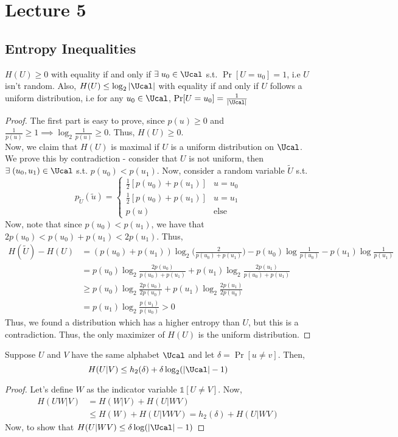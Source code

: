 \chapter{Lecture 5}
\section{Entropy Inequalities}
\begin{theorem}
$H(U) \geq 0$ with equality if and only if $\exists\; u_0 \in \Ucal$ s.t. $\Pr[U=u_0]=1$, i.e $U$ isn't random. Also, $H(U) \leq \log_2 |\Ucal|$ with equality if and only if $U$ follows a uniform distribution, i.e for any $u_0 \in \Ucal$, $\Pr[U=u_0] = \frac{1}{|\Ucal|}$
\end{theorem}
\begin{proof}
The first part is easy to prove, since $p(u) \geq 0$ and $\frac{1}{p(u)} \geq 1 \implies \log_2 \frac{1}{p(u)} \geq 0$. Thus, $H(U) \geq 0$. \\
Now, we claim that $H(U)$ is maximal if $U$ is a uniform distribution on $\Ucal$. \\
We prove this by contradiction - consider that $U$ is not uniform, then $\exists\; (u_0, u_1) \in \Ucal$ s.t. $p(u_0) < p(u_1)$. Now, consider a random variable $\widetilde U$ s.t.
\[ 
p_{\widetilde U}(\widetilde u) = \begin{cases}
\frac{1}{2}[p(u_0) + p(u_1)] & u = u_0 \\
\frac{1}{2}[p(u_0) + p(u_1)] & u = u_1 \\
p(u)  &\text{else}
\end{cases}
\]
Now, note that since $p(u_0) < p(u_1)$, we have that $2p(u_0) < p(u_0) + p(u_1) < 2p(u_1)$. Thus,
\begin{align*}
    H(\widetilde U) - H(U) &= (p(u_0) + p(u_1)) \log_2 \bigg(\frac{2}{p(u_0) + p(u_1)}\bigg) - p(u_0)\log\frac{1}{p(u_0)} - p(u_1) \log\frac{1}{p(u_1)} \\
    &= p(u_0)\log_2 \frac{2p(u_0)}{p(u_0) + p(u_1)} + p(u_1)\log_2 \frac{2p(u_1)}{p(u_0) + p(u_1)} \\
    &\geq p(u_0) \log_2 \frac{2p(u_0)}{2p(u_0)} + p(u_1)\log_2 \frac{2p(u_1)}{2p(u_0)} \\
    &= p(u_1) \log_2 \frac{p(u_1)}{p(u_0)} > 0
\end{align*}
Thus, we found a distribution which has a higher entropy than $U$, but this is a contradiction. Thus, the only maximizer of $H(U)$ is the uniform distribution.
\end{proof}
\begin{theorem}
Suppose $U$ and $V$ have the same alphabet $\Ucal$ and let $\delta= \Pr[u \neq v]$. Then, 
\[ H(U|V) \leq h_2(\delta) + \delta \log_2(|\Ucal| - 1)\]
\end{theorem}
\begin{proof}
Let's define $W$ as the indicator variable $\mathbb{1}[U\neq V]$. Now,
\begin{align*}
    H(UW|V) &= H(W|V) + H(U|WV) \\
    &\leq H(W) + H(U|VWV) = h_2(\delta) + H(U|WV)
\end{align*}
Now, to show that $H(U|WV) \leq \delta \log(|\Ucal| - 1)$
\end{proof}